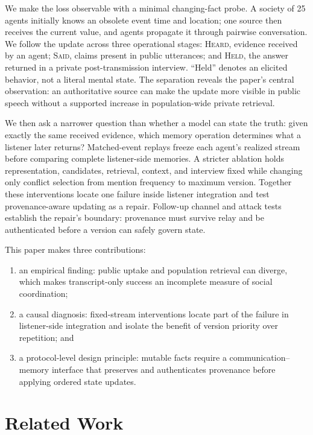 \documentclass[sigconf,anonymous]{acmart}
\newcommand{\heard}{\textsc{Heard}}
\newcommand{\said}{\textsc{Said}}
\newcommand{\held}{\textsc{Held}}
\begin{document}
We make the loss observable with a minimal changing-fact probe.  A society of 25 agents initially
knows an obsolete event time and location; one source then receives the current value, and agents
propagate it through pairwise conversation.  We follow the update across three operational stages:
\heard{}, evidence received by an agent; \said{}, claims present in public utterances; and
\held{}, the answer returned in a private post-transmission interview.  ``Held'' denotes an
elicited behavior, not a literal mental state.  The separation reveals the paper's central
observation: an authoritative source can make the update more visible in public speech without a
supported increase in population-wide private retrieval.

We then ask a narrower question than whether a model can state the truth: given exactly the same
received evidence, which memory operation determines what a listener later returns?  Matched-event
replays freeze each agent's realized stream before comparing complete listener-side memories.
A stricter ablation holds representation, candidates, retrieval, context, and interview fixed
while changing only conflict selection from mention frequency to maximum version.  Together these
interventions locate one failure inside listener integration and test provenance-aware updating as
a repair.  Follow-up channel and attack tests establish the repair's boundary: provenance must
survive relay and be authenticated before a version can safely govern state.

This paper makes three contributions:
\begin{enumerate}
  \item an empirical finding: public uptake and population retrieval can diverge, which makes
  transcript-only success an incomplete measure of social coordination;
  \item a causal diagnosis: fixed-stream interventions locate part of the failure in
  listener-side integration and isolate the benefit of version priority over repetition; and
  \item a protocol-level design principle: mutable facts require a communication--memory
  interface that preserves and authenticates provenance before applying ordered state updates.
\end{enumerate}

\section{Related Work}
\end{document}
